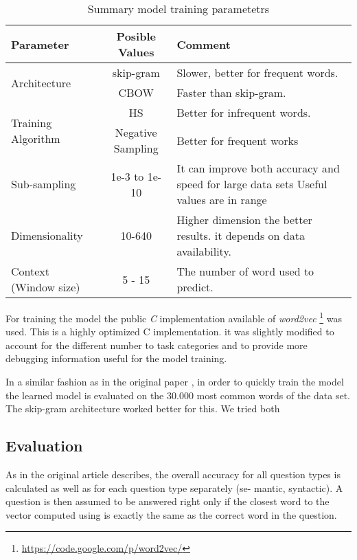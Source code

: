 \begin{table}[h]
   \centering
   \caption{Summary model training parametetrs} 
   \label{tab:word2_vec_parameters}
   
   \small
   \begin{tabular}{ |l|c|p{5cm}| }
   \hline           
    Parameter &  Posible Values & Comment \\  \hline           
    \multirow{2}{*}{Architecture}  & skip-gram  & Slower, better for frequent
    words. \\ 
    \cline{2-3}
    & \ac{CBOW}  &  Faster than skip-gram. \\ \hline
    \multirow{2}{*}{Training Algorithm}  & \ac{HS}  & Better for infrequent words.   \\ 
    \cline{2-3}
    & Negative Sampling & Better for frequent works \\ \hline
    Sub-sampling  & 1e-3 to 1e-10  &  It  can improve both accuracy and speed for large data
    sets Useful values are in range \\ \hline
    Dimensionality  & 10-640 & Higher dimension the better results. 
    it depends on data availability.  \\ \hline
    Context (Window size)  & 5 - 15 & The number of word used to predict. \\ \hline

    
\end{tabular}
\end{table}

For training  the model the public \emph{C} implementation available of
\textit{word2vec} \footnote{\url{https://code.google.com/p/word2vec/}} was
used.  This is a highly optimized C implementation. it was slightly modified to account for the different
number to task categories and to provide more debugging information useful
for the model training. 

In a similar fashion as in the original paper
\cite{DBLP:journals/corr/abs-1301-3781},  in order to quickly train the model
the  learned model is evaluated on  the 30.000 most common words of the
data set. The skip-gram architecture worked better for this.  We tried both 

\subsection{Evaluation}
\label{experiments:sub:evaluation}

As in the original article describes, the overall accuracy for all question
types is calculated as well as  for each question type separately (se-
mantic, syntactic). A question is then assumed to be answered right  only if the closest word to the
vector computed using  is exactly the same as the correct word in the
question. 
 
